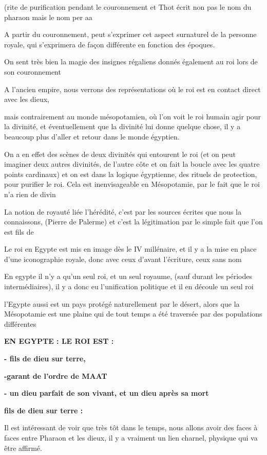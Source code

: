 \documentclass[a4paper,10pt]{article}
\begin{document}
\begin{itemize}
(rite de purification pendant le couronnement et Thot écrit non pas le
nom du pharaon mais le nom  per aa

A partir du couronnement, peut s'exprimer cet aspect
surnaturel de la personne royale, qui s'exprimera de
façon différente en fonction des époques. 

On sent très bien la magie des insignes régaliens donnés également au
roi lors de son couronnement

A l'ancien empire, nous verrons des représentations où
le roi est en contact direct avec les dieux, 

mais contrairement au monde mésopotamien, où l'on voit
le roi humain agir pour la divinité, et éventuellement que la divinité
lui donne quelque chose, il y a beaucoup plus d'aller
et retour dans le monde égyptien.

On a en effet des scènes de deux divinités qui entourent le roi (et on
peut imaginer deux autres divinités, de l'autre côte
et on fait la boucle avec les quatre points cardinaux) et on est dans
la logique égyptienne, des rituels de protection, pour purifier le roi.
Cela est inenvisageable en Mésopotamie, par le fait que le roi
n'a rien de divin

La notion de royauté liée  l'hérédité,
c'est par les sources écrites que nous la connaissons,
(Pierre de Palerme) et c'est la légitimation par le
simple fait que l'on est fils de 

Le roi en Egypte est mis en image dès le IV millénaire, et il y a la
mise en place d'une iconographie royale, donc avec
ceux d'avant l'écriture, ceux sans
nom

En egypte  il n'y a qu'un seul roi, et
un seul royaume, (sauf durant les périodes intermédiaires), il y a donc
eu l'unification politique et il en découle un seul
roi

l'Egypte aussi est un pays protégé naturellement par le
désert, alors que la Mésopotamie est une plaine qui de tout temps a été
traversée par des populations différentes

\textbf{EN EGYPTE : LE ROI EST :}

\textbf{{}- fils de dieu sur terre,}

\textbf{{}-garant de l'ordre de MAAT}

\textbf{{}- un dieu parfait de son vivant, et un dieu après sa mort}

\textbf{fils de dieu sur terre : }

Il est intéressant de voir que très tôt dans le temps, nous allons avoir
des faces à faces entre Pharaon et les dieux, il y a vraiment un lien
charnel, physique qui va être affirmé.


\end{itemize}
\end{document}
